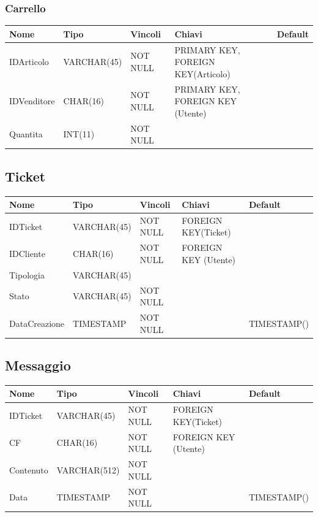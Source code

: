 \documentclass[12pt,a4paper]{article}
\begin{document}
\subsubsection{Carrello}
\begin{center}
\begin{tabular}{|l|l|l|l|l|}
\hline
\rowcolor[HTML]{C0C0C0} 
\textbf{Nome} & \textbf{Tipo} & \textbf{Vincoli} & \textbf{Chiavi} & \textbf{Default}  \\ \hline
IDArticolo & VARCHAR(45) & NOT NULL & PRIMARY KEY, FOREIGN KEY(Articolo) & \\ \hline
IDVenditore & CHAR(16) & NOT NULL & PRIMARY KEY, FOREIGN KEY (Utente)& \\ \hline
Quantita & INT(11) & NOT NULL & & \\ \hline
\end{tabular}
\end{center}

\newpage

\subsection{Ticket}
\begin{center}
\begin{tabular}{|l|l|l|l|l|}
\hline
\rowcolor[HTML]{C0C0C0} 
\textbf{Nome} & \textbf{Tipo} & \textbf{Vincoli} & \textbf{Chiavi} & \textbf{Default}  \\ \hline
IDTicket & VARCHAR(45) & NOT NULL & FOREIGN KEY(Ticket) & \\ \hline
IDCliente & CHAR(16) & NOT NULL & FOREIGN KEY (Utente)& \\ \hline
Tipologia & VARCHAR(45) & & & \\ \hline
Stato & VARCHAR(45) & NOT NULL & & \\ \hline
DataCreazione & TIMESTAMP & NOT NULL & & TIMESTAMP() \\ \hline
\end{tabular}
\end{center}


\subsection{Messaggio}
\begin{center}
\begin{tabular}{|l|l|l|l|l|}
\hline
\rowcolor[HTML]{C0C0C0} 
\textbf{Nome} & \textbf{Tipo} & \textbf{Vincoli} & \textbf{Chiavi} & \textbf{Default}  \\ \hline
IDTicket & VARCHAR(45) & NOT NULL & FOREIGN KEY(Ticket) & \\ \hline
CF & CHAR(16) & NOT NULL & FOREIGN KEY (Utente)& \\ \hline
Contenuto & VARCHAR(512) & NOT NULL & & \\ \hline
Data & TIMESTAMP & NOT NULL & & TIMESTAMP() \\ \hline
\end{tabular}
\end{center}
\end{document}
